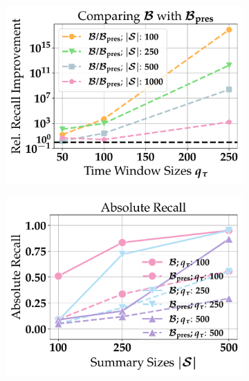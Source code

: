 \begin{figure}[t]
	\centering
	\begin{subfigure}{.32\linewidth}
		\centering
		\includegraphics[width=1.0\linewidth]{revision_plots/ablation_plot.pdf}
		\vspace{-18pt}
		\caption{}
		\label{plot:ablation_study}
	\end{subfigure}
	\begin{subfigure}{.32\linewidth}
		\centering
		\includegraphics[width=1.0\linewidth]{revision_plots/total_matches_ratio_recall_stream_size_2000.pdf}
		\vspace{-18pt}
		\caption{}
		\label{plot:average_total_match_ratio_recall_2000}
	\end{subfigure}

\end{figure}
